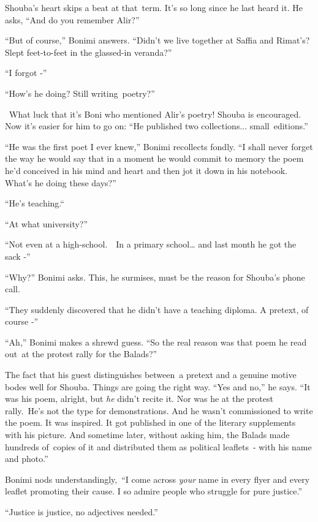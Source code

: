\documentclass[twoside,11pt]{book}
\begin{document}
Shouba's heart skips a beat at that\ term. It's so long since he last heard it. He asks, ``And do you
remember Alir?''

``But of course,'' Bonimi answers. ``Didn't we live together at Saffia and
Rimat's? Slept feet-to-feet in the glassed-in veranda?'' 

``I forgot -'' 

``How's he doing? Still writing~poetry?''

~What luck that it{}'s Boni who mentioned Alir's poetry! Shouba is encouraged. Now it's easier for him to go on:
``He published two collections...
small{\ }editions.''

``He was the first poet I ever knew,'' Bonimi recollects fondly. ``I shall never
forget the way he would say that in a moment he would commit to memory the poem he'd conceived in his mind and heart
and then jot it down in his notebook. What's he doing these days?''

``He's teaching.``\ 

``At what university?''

``Not even {at} a high-school.{\ \ }{In a} primary
school{\dots} and last month he got the sack -'' 

``Why?'' Bonimi asks. This, he surmises, must be the reason for Shouba's phone call.\ 

``They suddenly discovered that he didn't have a teaching diploma. A pretext, of course -''

``Ah,'' Bonimi makes a shrewd guess. ``So the real reason was that poem he read
out~at the protest rally for the Balads?''

The fact that his guest distinguishes between~a pretext and a genuine motive bodes well for Shouba. Things are going the
right way. ``Yes and no,'' he says. ``It was his poem, alright, but \textit{he}
didn't recite it. Nor was he at the protest rally.\ He's not the type for demonstrations. And he wasn't commissioned to
write the poem. It was inspired. It got published in one of the literary supplements with his picture. And sometime
later, without asking him, the Balads made hundreds of~copies of it and distributed them as political leaflets\ {}-
with his name and photo.'' 

Bonimi nods understandingly,~``I come across \textit{your }name in every flyer and every leaflet promoting
their cause. I so admire people who struggle for pure justice.''

``Justice is justice, no adjectives needed.''
\end{document}
